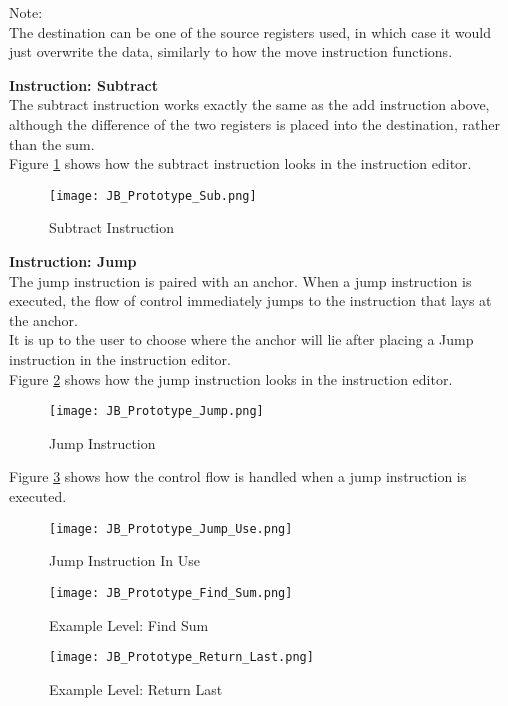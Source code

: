 Note:\\
The destination can be one of the source registers used, in which case it would
just overwrite the data, similarly to how the move instruction functions.\\
\newpage

\textbf{Instruction: Subtract}\\

The subtract instruction works exactly the same as the add instruction above,
although the difference of the two registers is placed into the destination, rather
than the sum.\\

Figure \ref{fig:Sub_Instruction} shows how the subtract instruction looks in the
instruction editor.

\begin{figure}[!hb]
  \caption{Subtract Instruction}
  \label{fig:Sub_Instruction}
  \centering
  \texttt{[image: JB\_Prototype\_Sub.png]}
\end{figure}

\textbf{Instruction: Jump}\\

The jump instruction is paired with an anchor. When a jump instruction is executed,
the flow of control immediately jumps to the instruction that lays at the anchor.\\

It is up to the user to choose where the anchor will lie after placing a Jump instruction
in the instruction editor.\\

Figure \ref{fig:Jump_Instruction} shows how the jump instruction looks in the
instruction editor.

\begin{figure}[!hb]
  \caption{Jump Instruction}
  \label{fig:Jump_Instruction}
  \centering
  \texttt{[image: JB\_Prototype\_Jump.png]}
\end{figure}

Figure \ref{fig:Jump_Instruction_Use} shows how the control flow is handled when a jump instruction is
executed.

\begin{figure}[!hb]
  \caption{Jump Instruction In Use}
  \label{fig:Jump_Instruction_Use}
  \centering
  \texttt{[image: JB\_Prototype\_Jump\_Use.png]}
\end{figure}
\vfill
\clearpage

\begin{figure}[!hb]
  \caption{Example Level: Find Sum}
  \label{fig:Find_Sum}
  \centering
  \texttt{[image: JB\_Prototype\_Find\_Sum.png]}
\end{figure}
\vfill
\clearpage

\begin{figure}[!hb]
  \caption{Example Level: Return Last}
  \label{fig:Return_Last}
  \centering
  \texttt{[image: JB\_Prototype\_Return\_Last.png]}
\end{figure}
\vfill
\clearpage

\newpage
